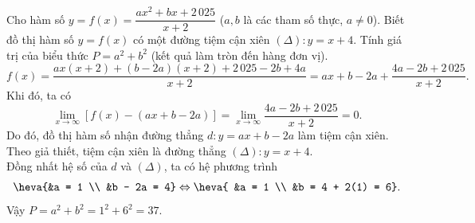 \begin{ex}%
Cho hàm số $y = f(x) = \dfrac{ax^2 + bx + 2\,025}{x + 2}$ ($a, b$ là các tham số thực, $a \ne 0$). Biết đồ thị hàm số $y = f(x)$ có một đường tiệm cận xiên $(\Delta): y = x + 4$. Tính giá trị của biểu thức $P = a^2 + b^2$ (kết quả làm tròn đến hàng đơn vị).
\loigiai 
{
$$ f(x) = \dfrac{ax(x+2) + (b-2a)(x+2) + 2\,025 - 2b + 4a}{x+2} = ax + b - 2a + \dfrac{4a - 2b + 2\,025}{x + 2}.$$
Khi đó, ta có
$$ \lim\limits_{x \to \infty} [f(x) - (ax + b - 2a)] = \lim\limits_{x \to \infty} \dfrac{4a - 2b + 2\,025}{x + 2} = 0.$$
Do đó, đồ thị hàm số nhận đường thẳng $d: y = ax + b - 2a$ làm tiệm cận xiên.\\
Theo giả thiết, tiệm cận xiên là đường thẳng $(\Delta): y = x + 4$.\\
Đồng nhất hệ số của $d$ và $(\Delta)$, ta có hệ phương trình
$$\heva{&a = 1 \\ &b - 2a = 4}\Leftrightarrow \heva{ &a = 1 \\ &b = 4 + 2(1) = 6}.$$
Vậy $P = a^2 + b^2 = 1^2 + 6^2 = 37$.
}
\end{ex}

